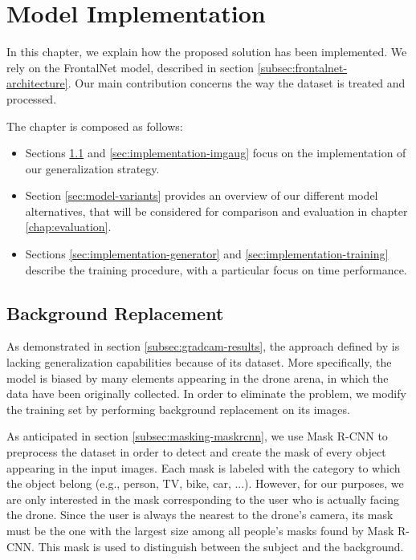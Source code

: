\chapter{Model Implementation}
\label{chap:implementation}

In this chapter, we explain how the proposed solution has been implemented. We rely on the FrontalNet model, described in section \ref{subsec:frontalnet-architecture}. Our main contribution concerns the way the dataset is treated and processed. 

The chapter is composed as follows:
\begin{itemize}
	\item Sections \ref{sec:implementation-bgreplace} and \ref{sec:implementation-imgaug} focus on the implementation of our generalization strategy.
	\item Section \ref{sec:model-variants} provides an overview of our different model alternatives, that will be considered for comparison and evaluation in chapter \ref{chap:evaluation}.
	\item Sections \ref{sec:implementation-generator} and \ref{sec:implementation-training} describe the training procedure, with a particular focus on time performance.
\end{itemize}




\section{Background Replacement}
\label{sec:implementation-bgreplace}

As demonstrated in section \ref{subsec:gradcam-results}, the approach defined by \cite{mantegazza2019visionbased} is lacking generalization capabilities because of its dataset. More specifically, the model is biased by many elements appearing in the drone arena, in which the data have been originally collected. In order to eliminate the problem, we modify the training set by performing background replacement on its images.

As anticipated in section \ref{subsec:masking-maskrcnn}, we use Mask R-CNN to preprocess the dataset in order to detect and create the mask of every object appearing in the input images. Each mask is labeled with the category to which the object belong (e.g., person, TV, bike, car, ...). However, for our purposes, we are only interested in the mask corresponding to the user who is actually facing the drone. Since the user is always the nearest to the drone's camera, its mask must be the one with the largest size among all people's masks found by Mask R-CNN. This mask is used to distinguish between the subject and the background. 

